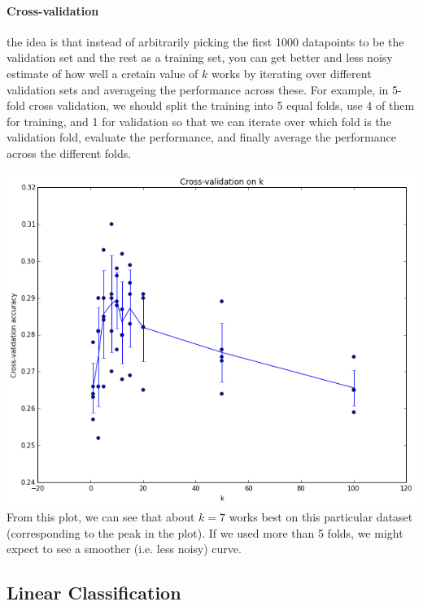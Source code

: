 \documentclass{article}
\begin{document}
\paragraph{Cross-validation} the idea is that instead of arbitrarily picking the first 1000 datapoints to be the validation set and the rest as a training set, you can get better and less noisy estimate of how well a cretain value of $k$ works by iterating over different validation sets and averageing the performance across these. For example, in 5-fold cross validation, we should split the training into 5 equal folds, use 4 of them for training, and 1 for validation so that we can iterate over which fold is the validation fold, evaluate the performance, and finally average the performance across the different folds.

\includegraphics[scale=0.4]{images/cvplot.png} \\
From this plot, we can see that about $k = 7$ works best on this particular dataset (corresponding to the peak in the plot). If we used more than 5 folds, we might expect to see a smoother (i.e. less noisy) curve.

\subsection{Linear Classification}
\end{document}
